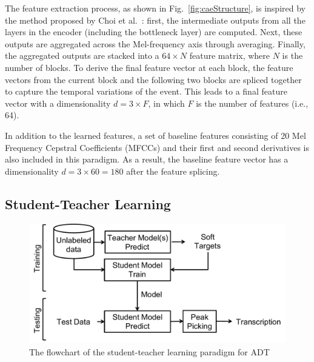 \documentclass{article}
\newcommand{\comment}[1]{{\textcolor{blue}{#1}}}
\begin{document}
The feature extraction process, as shown in Fig.~\ref{fig:caeStructure}, is inspired by the method proposed by Choi et al.~\cite{Choi2017a}: first, the intermediate outputs from all the layers in the encoder (including the bottleneck layer) are computed. Next, these outputs are aggregated across the Mel-frequency axis through averaging. Finally, the aggregated outputs are stacked into a $64 \times N$ feature matrix, where $N$ is the number of blocks. %
To derive the final feature vector at each block, the feature vectors from the current block and the following two blocks are spliced together to capture the temporal variations of the event. This leads to a final feature vector with a dimensionality $d = 3 \times F$, in which $F$ is the number of features (i.e., 64). 

In addition to the learned features, a set of baseline features consisting of 20 Mel Frequency Cepstral Coefficients (MFCCs) and their first and second derivatives is also included in this paradigm. As a result, the baseline feature vector has a dimensionality $d = 3 \times 60 = 180$ after the feature splicing. 

\subsection{Student-Teacher Learning}
\label{subsec:studentTeacher}

\begin{figure}
\centering
\includegraphics[width = \columnwidth]{./figs/studentTeacherSys.pdf}
\caption{The flowchart of the student-teacher learning paradigm for ADT}
\label{fig:studentTeacherFlow}
\end{figure}
\end{document}
